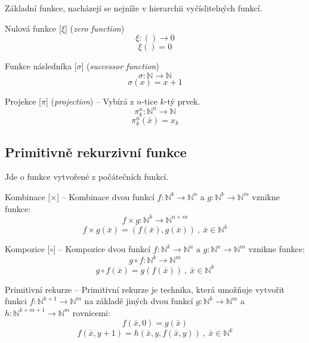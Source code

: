 Základní funkce, nacházejí se nejníže v hierarchii vyčíslitelných funkcí.

\begin{compactitem}
    \item Nulová funkce [$\xi$] (\textit{zero function})
    $$ \xi : () \rightarrow 0 $$
    $$ \xi() = 0 $$

    \item Funkce následníka [$\sigma$] (\textit{successor function})
    $$ \sigma : \mathbb{N} \rightarrow \mathbb{N} $$
    $$ \sigma(x) = x+1 $$

    \item Projekce [$\pi$] (\textit{projection}) -- Vybírá z $n$-tice $k$-tý prvek.
    $$ \pi_k^n : \mathbb{N}^n \rightarrow \mathbb{N} $$
    $$ \pi_k^n(\bar{x}) = x_k $$
\end{compactitem}

\subsection{Primitivně rekurzivní funkce}

Jde o funkce vytvořené z počátečních funkcí.

\begin{compactitem}
    \item Kombinace [$\times$] -- Kombinace dvou funkcí $f : \mathbb{N}^k \rightarrow \mathbb{N}^n$ a $g : \mathbb{N}^k \rightarrow \mathbb{N}^m$ vznikne funkce:
    $$ f \times g : \mathbb{N}^k \rightarrow \mathbb{N}^{n+m} $$
    $$ f \times g (\bar{x}) = (f(\bar{x}), g(\bar{x})) ~,~ \bar{x} \in \mathbb{N}^k $$

    \item Kompozice [$\circ$] -- Kompozice dvou funkcí $f : \mathbb{N}^k \rightarrow \mathbb{N}^n$ a $g : \mathbb{N}^n \rightarrow \mathbb{N}^m$ vznikne funkce:
    $$ g \circ f : \mathbb{N}^k \rightarrow \mathbb{N}^m $$
    $$ g \circ f (\bar{x}) = g(f(\bar{x})) ~,~ \bar{x} \in \mathbb{N}^k $$

    \item Primitivní rekurze -- Primitivní rekurze je technika, která umožňuje vytvořit funkci $f : \mathbb{N}^{k+1} \rightarrow \mathbb{N}^m$ na základě jiných dvou funkcí $g : \mathbb{N}^k \rightarrow \mathbb{N}^m$ a $h : \mathbb{N}^{k+m+1} \rightarrow \mathbb{N}^m$ rovnicemi:
    $$ f(\bar{x}, 0) = g(\bar{x}) $$
    $$ f(\bar{x}, y + 1) = h(\bar{x}, y, f(\bar{x}, y)) ~,~ \bar{x} \in \mathbb{N}^k $$
\end{compactitem}

